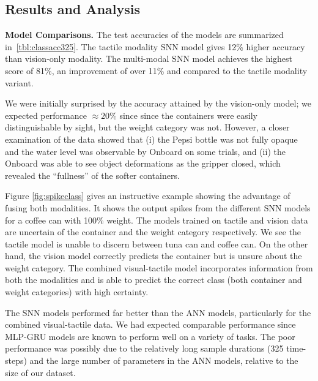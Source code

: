 \documentclass[fyp]{socreport}
\begin{document}
\subsection{Results and Analysis}

\noindent\textbf{Model Comparisons.}
The test accuracies of the models are summarized in~\autoref{tbl:classacc325}.
The tactile modality SNN model gives 12\% higher accuracy than vision-only
modality. The multi-modal SNN model achieves the highest score of 81\%, an
improvement of over 11\% and compared to the tactile modality variant.

We were initially surprised by the accuracy attained by the vision-only model;
we expected performance $\approx 20\%$ since since the containers were easily
distinguishable by sight, but the weight category was not. However, a closer
examination of the data showed that (i) the Pepsi bottle was not fully opaque
and the water level was observable by Onboard on some trials, and (ii) the
Onboard was able to see object deformations as the gripper closed, which
revealed the ``fullness'' of the softer containers.

Figure \ref{fig:spikeclass} gives an instructive example showing the advantage
of fusing both modalities. It shows the output spikes from the different SNN
models for a coffee can with 100\% weight. The models trained on tactile and
vision data are uncertain of the container and the weight category respectively.
We see the tactile model is unable to discern between tuna can and coffee can.
On the other hand, the vision model correctly predicts the container but is
unsure about the weight category. The combined visual-tactile model incorporates
information from both the modalities and is able to predict the correct class
(both container and weight categories) with high certainty.

The SNN models performed far better than the ANN models, particularly for the
combined visual-tactile data. We had expected comparable performance since
MLP-GRU models are known to perform well on a variety of tasks. The poor
performance was possibly due to the relatively long sample durations (325
time-steps) and the large number of parameters in the ANN models, relative to
the size of our dataset.
\end{document}
